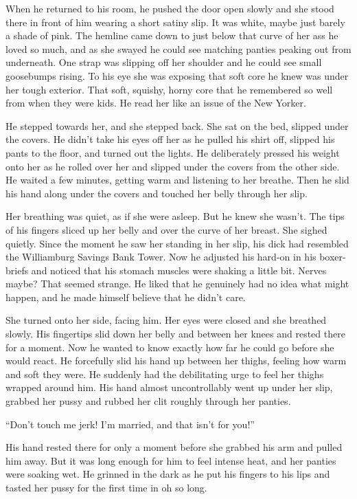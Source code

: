 \documentclass[letterpaper]{article}
\begin{document}
When he returned to his room, he pushed the door open slowly and she stood there in front of him wearing a short satiny slip. It was white, maybe just barely a shade of pink.
The hemline came down to just below that curve of her ass he loved so much, and as she swayed he could see matching panties peaking out from underneath.
One strap was slipping off her shoulder and he could see small goosebumps rising. To his eye she was exposing that soft core he knew was under her tough exterior. 
That soft, squishy, horny core that he remembered so well from when they were kids. He read her like an issue of the New Yorker.

He stepped towards her, and she stepped back. She sat on the bed, slipped under the covers. He didn't take his eyes off her as he pulled his shirt off, slipped his pants to the floor, and turned out the lights.
He deliberately pressed his weight onto her as he rolled over her and slipped under the covers from the other side. He waited a few minutes, getting warm and listening to her breathe. 
Then he slid his hand along under the covers and touched her belly through her slip.

Her breathing was quiet, as if she were asleep. But he knew she wasn't. 
The tips of his fingers sliced up her belly and over the curve of her breast. She sighed quietly.
Since the moment he saw her standing in her slip, his dick had resembled the Williamburg Savings Bank Tower. Now he adjusted his hard-on in his boxer-briefs and noticed that his stomach muscles were shaking a little bit.
Nerves maybe? That seemed strange. He liked that he genuinely had no idea what might happen, and he made himself believe that he didn't care.

She turned onto her side, facing him. Her eyes were closed and she breathed slowly. His fingertips slid down her belly and between her knees and rested there for a moment.
Now he wanted to know exactly how far he could go before she would react. He forcefully slid his hand up between her thighs, feeling how warm and soft they were. 
He suddenly had the debilitating urge to feel her thighs wrapped around him. 
His hand almost uncontrollably went up under her slip, grabbed her pussy and rubbed her clit roughly through her panties.

``Don't touch me jerk! I'm married, and that isn't for you!''

His hand rested there for only a moment before she grabbed his arm and pulled him away. 
But it was long enough for him to feel intense heat, and her panties were soaking wet. He grinned in the dark as he put his fingers to his lips and tasted her pussy for the first time in oh so long.
\end{document}
